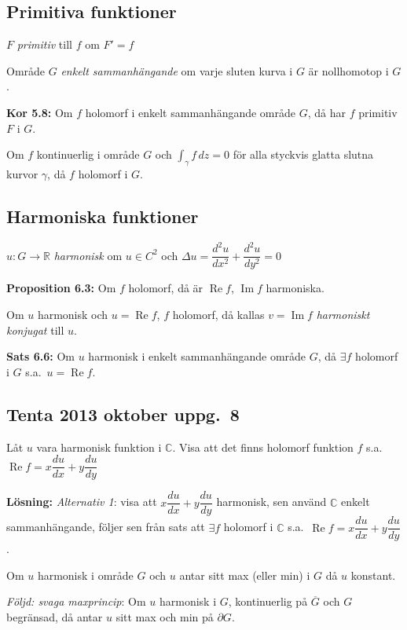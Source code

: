 \subsection{Primitiva funktioner}
\begin{definition}
$F$ \emph{primitiv} till $f$ om $F' = f$
\end{definition}
\begin{definition}
Område $G$ \emph{enkelt sammanhängande} om varje sluten kurva i $G$ är nollhomotop i $G$.
\end{definition}

\textbf{Kor 5.8:} Om $f$ holomorf i enkelt sammanhängande område $G$, då har $f$ primitiv $F$ i $G$.

\begin{theorem}
Om $f$ kontinuerlig i område $G$ och $\displaystyle\int_\gamma f\,dz = 0$ för alla styckvis glatta slutna kurvor $\gamma$, då $f$ holomorf i $G$.
\end{theorem}

\subsection{Harmoniska funktioner}
\begin{definition}
$u : G \to \mathbb{R}$ \emph{harmonisk} om $u \in C^2$ och $\Delta u = \dfrac{d^2u}{dx^2} + \dfrac{d^2u}{dy^2} = 0$
\end{definition}

\textbf{Proposition 6.3:} Om $f$ holomorf, då är $\operatorname{Re} f$, $\operatorname{Im} f$ harmoniska.

\begin{definition}
Om $u$ harmonisk och $u = \operatorname{Re} f$, $f$ holomorf, då kallas $v = \operatorname{Im} f$ \emph{harmoniskt konjugat} till $u$.
\end{definition}

\textbf{Sats 6.6:} Om $u$ harmonisk i enkelt sammanhängande område $G$, då $\exists f$ holomorf i $G$ s.a.\ $u = \operatorname{Re} f$.

\subsection{Tenta 2013 oktober uppg.\ 8}
Låt $u$ vara harmonisk funktion i $\mathbb{C}$. Visa att det finns holomorf funktion $f$ s.a.\ $\operatorname{Re} f = x\dfrac{du}{dx} + y\dfrac{du}{dy}$

\textbf{Lösning:} \emph{Alternativ 1}: visa att $x\dfrac{du}{dx} + y\dfrac{du}{dy}$ harmonisk, sen använd $\mathbb{C}$ enkelt sammanhängande, följer sen från sats att $\exists f$ holomorf i $\mathbb{C}$ s.a.\ $\operatorname{Re} f = x\dfrac{du}{dx} + y\dfrac{du}{dy}$.

\begin{theorem}
Om $u$ harmonisk i område $G$ och $u$ antar sitt max (eller min) i $G$ då $u$ konstant.
\end{theorem}

\emph{Följd: svaga maxprincip}: Om $u$ harmonisk i $G$, kontinuerlig på $\overline{G}$ och $G$ begränsad, då antar $u$ sitt max och min på $\partial G$.
